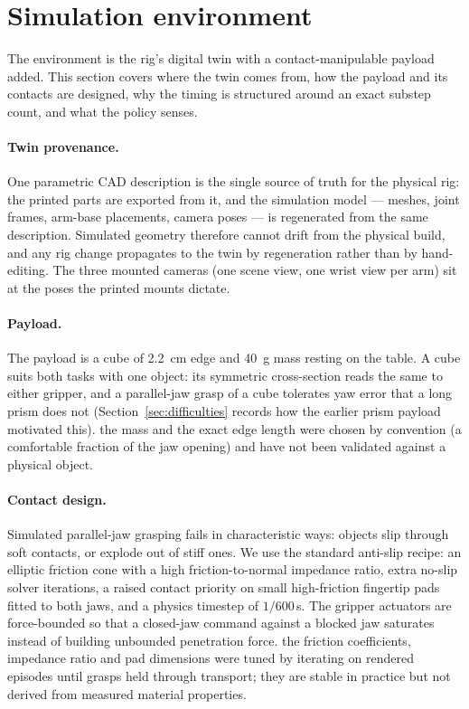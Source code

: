 \section{Simulation environment}
\label{sec:environment}

The environment is the rig's digital twin with a contact-manipulable
payload added. This section covers where the twin comes from, how the
payload and its contacts are designed, why the timing is structured
around an exact substep count, and what the policy senses.

\paragraph{Twin provenance.}
One parametric CAD description is the single source of truth for the
physical rig: the printed parts are exported from it, and the simulation
model --- meshes, joint frames, arm-base placements, camera poses --- is
regenerated from the same description. Simulated geometry therefore
cannot drift from the physical build, and any rig change propagates to
the twin by regeneration rather than by hand-editing. The three mounted
cameras (one scene view, one wrist view per arm) sit at the poses the
printed mounts dictate.

\paragraph{Payload.}
The payload is a cube of \SI{2.2}{\centi\metre} edge and
\SI{40}{\gram} mass resting on the table. A cube suits both tasks with
one object: its symmetric cross-section reads the same to either
gripper, and a parallel-jaw grasp of a cube tolerates yaw error that a
long prism does not (Section~\ref{sec:difficulties} records how the
earlier prism payload motivated this). \unjustified{} the mass and the
exact edge length were chosen by convention (a comfortable fraction of
the jaw opening) and have not been validated against a physical object.

\paragraph{Contact design.}
Simulated parallel-jaw grasping fails in characteristic ways: objects
slip through soft contacts, or explode out of stiff ones. We use the
standard anti-slip recipe: an elliptic friction cone with a high
friction-to-normal impedance ratio, extra no-slip solver iterations, a
raised contact priority on small high-friction fingertip pads fitted to
both jaws, and a physics timestep of $1/600$\,\si{\second}. The gripper
actuators are force-bounded so that a closed-jaw command against a
blocked jaw saturates instead of building unbounded penetration force.
\unjustified{} the friction coefficients, impedance ratio and pad
dimensions were tuned by iterating on rendered episodes until grasps
held through transport; they are stable in practice but not derived
from measured material properties.


